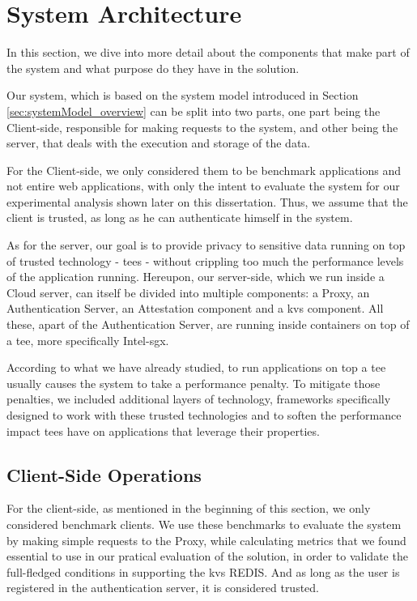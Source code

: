 \section{System Architecture}
\label{sec:systemArchitecture}
In this section, we dive into more detail about the components that make part of the system and what purpose do they have in the solution.  

Our system, which is based on the system model introduced in Section \ref{sec:systemModel_overview} can be split into two parts, one part being the Client-side, responsible for making requests to the system, and other being the server, that deals with the execution and storage of the data.

For the Client-side, we only considered them to be benchmark applications and not entire web applications, with only the intent to evaluate the system for our experimental analysis shown later on this dissertation. Thus, we assume that the client is trusted, as long as he can authenticate himself in the system.

As for the server, our goal is to provide privacy to sensitive data running on top of trusted technology - \gls{tee}s - without crippling too much the performance levels of the application running. 
Hereupon, our server-side, which we run inside a Cloud server, can itself be divided into multiple components: a Proxy, an Authentication Server, an Attestation component and a \gls{kvs} component. All these, apart of the Authentication Server, are running inside containers on top of a \gls{tee}, more specifically Intel-\gls{sgx}.

According to what we have already studied, to run applications on top a \gls{tee} usually causes the system to take a performance penalty. To mitigate those penalties, we included additional layers of technology, frameworks specifically designed to work with these trusted technologies and to soften the performance impact \gls{tee}s have on applications that leverage their properties. 

\subsection{Client-Side Operations}

For the client-side, as mentioned in the beginning of this section, we only considered benchmark clients. We use these benchmarks to evaluate the system by making simple requests to the Proxy, while calculating metrics that we found essential to use in our pratical evaluation of the solution, in order to validate the full-fledged conditions in supporting the \gls{kvs} REDIS. And as long as the user is registered in the authentication server, it is considered trusted.

